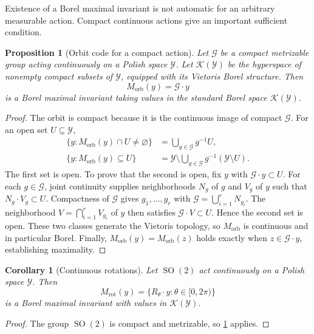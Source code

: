 \documentclass[11pt]{article}
\newtheorem{proposition}[theorem]{Proposition}
\newtheorem{corollary}[theorem]{Corollary}
\theoremstyle{definition}
\theoremstyle{remark}
\newcommand{\cY}{\mathcal Y}
\newcommand{\cG}{\mathcal G}
\newcommand{\cK}{\mathcal K}
\newcommand{\1}{\mathbf 1}
\begin{document}
Existence of a Borel maximal invariant is not automatic for an arbitrary
measurable action.  Compact continuous actions give an important sufficient
condition.

\begin{proposition}[Orbit code for a compact action]\label{prop:compact}
Let \(\cG\) be a compact metrizable group acting continuously on a Polish space
\(\cY\).  Let \(\cK(\cY)\) be the hyperspace of nonempty compact subsets of
\(\cY\), equipped with its Vietoris Borel structure.  Then
\[
  M_{\mathrm{orb}}(y)=\cG\cdot y
\]
is a Borel maximal invariant taking values in the standard Borel space
\(\cK(\cY)\).
\end{proposition}

\begin{proof}
The orbit is compact because it is the continuous image of compact \(\cG\).
For an open set \(U\subseteq\cY\),
\[
\begin{split}
 \{y:M_{\mathrm{orb}}(y)\cap U\ne\varnothing\}
   &=\bigcup_{g\in\cG}g^{-1}U,\\
 \{y:M_{\mathrm{orb}}(y)\subseteq U\}
   &=\cY\setminus\bigcup_{g\in\cG}g^{-1}(\cY\setminus U).
\end{split}
\]
The first set is open.  To prove that the second is open, fix \(y\) with
\(\cG\cdot y\subset U\).  For each \(g\in\cG\), joint continuity supplies
neighborhoods \(N_g\) of \(g\) and \(V_g\) of \(y\) such that
\(N_g\cdot V_g\subset U\).  Compactness of \(\cG\) gives
\(g_1,\ldots,g_r\) with \(\cG=\bigcup_{i=1}^rN_{g_i}\).  The neighborhood
\(V=\bigcap_{i=1}^rV_{g_i}\) of \(y\) then satisfies
\(\cG\cdot V\subset U\).  Hence the second set is open.  These two classes
generate the Vietoris topology, so \(M_{\mathrm{orb}}\) is continuous and in
particular Borel.  Finally,
\(M_{\mathrm{orb}}(y)=M_{\mathrm{orb}}(z)\) holds exactly when
\(z\in\cG\cdot y\), establishing maximality.
\end{proof}

\begin{corollary}[Continuous rotations]\label{cor:continuous-rotations}
Let \(\operatorname{SO}(2)\) act continuously on a Polish space \(\cY\).  Then
\[
  M_{\mathrm{rot}}(y)
  =\{R_\theta\cdot y:\theta\in[0,2\pi)\}
\]
is a Borel maximal invariant with values in \(\cK(\cY)\).
\end{corollary}

\begin{proof}
The group \(\operatorname{SO}(2)\) is compact and metrizable, so
\cref{prop:compact} applies.
\end{proof}
\end{document}
